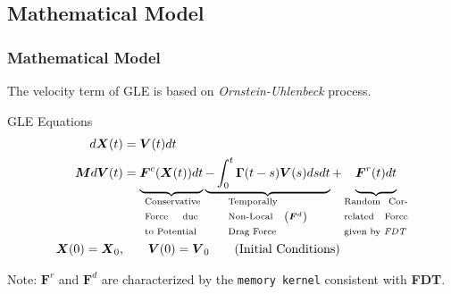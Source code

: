 \documentclass[a4paper,10pt]{beamer}
\newcommand{\BS}[1]{\boldsymbol{#1}}
\newcommand{\rb}[1]{\left( #1 \right)}
\begin{document}
	\begin{frame}
		\small
		\subsection{Mathematical Model}
		\frametitle{Mathematical Model}
		
		The velocity term of GLE is based on \textit{Ornstein-Uhlenbeck} process.
	
		\begin{block}{GLE Equations}
			\begin{align}
			d\BS{X}(t) &= \BS{V}(t) dt \\
			\BS{M} d\BS{V}(t) &= \underbrace{\vphantom{- \int_{0}^{t} \BS{\Gamma}(t-s) \BS{V}(s) ds dt}\BS{F}^{c}(\BS{X}(t)) dt}_{\text{\centering \begin{minipage}{1.5cm}
					Conservative Force due to Potential
			\end{minipage}}}
			\underbrace{- \int_{0}^{t} \BS{\Gamma}(t-s) \BS{V}(s) ds dt}_{\text{\centering \begin{minipage}{1.5cm}
				Temporally Non-Local Drag Force
				\end{minipage}}\;\rb{\BS{F}^{d}}} + \underbrace{\vphantom{- \int_{0}^{t} \BS{\Gamma}(t-s) \BS{V}(s) ds dt}\BS{F}^{r}(t)dt}_{\text{\begin{minipage}{1.8cm}
				Random Correlated Force given by \textit{FDT}
				\end{minipage}}} \\
			\BS{X}(0) = \BS{X}_{0}, &\qquad \BS{V}(0) = \BS{V}_{0} \qquad (\text{Initial Conditions})
			\end{align}
		\end{block}
		\begin{alertblock}{Note:}
			$\BS{F}^{r}$ and $\BS{F}^{d}$ are characterized by the \texttt{memory kernel} consistent with \textbf{FDT}.
		\end{alertblock}
	\end{frame}
\end{document}
